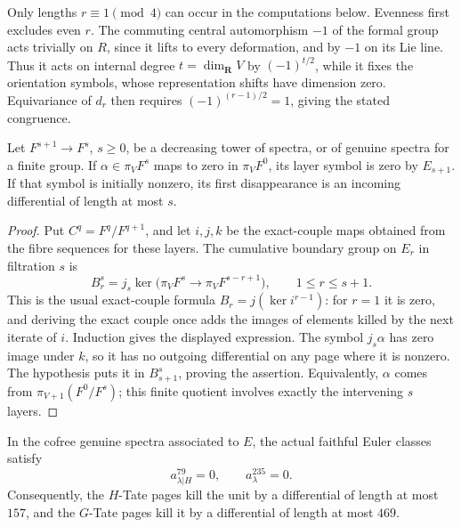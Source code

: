 Only lengths \(r\equiv1\pmod4\) can occur in the computations
below.  Evenness first excludes even \(r\).
The commuting central automorphism \(-1\) of the formal group
acts trivially on \(R\), since it lifts to every deformation,
and by \(-1\) on its Lie line.  Thus it acts on internal degree
\(t=\dim_{\mathbf R}V\) by \((-1)^{t/2}\), while it fixes the
orientation symbols, whose representation shifts have dimension zero.
Equivariance of \(d_r\) then requires
\((-1)^{(r-1)/2}=1\), giving the stated congruence.

\begin{lemma}
\label{det:finite-boundary}
Let \(F^{s+1}\to F^s\), \(s\geq0\), be a decreasing tower of
spectra, or of genuine spectra for a finite group.
If \(\alpha\in\pi_VF^s\) maps to zero in \(\pi_VF^0\),
its layer symbol is zero by \(E_{s+1}\).
If that symbol is initially nonzero, its first disappearance
is an incoming differential of length at most \(s\).
\end{lemma}

\begin{proof}
Put \(C^q=F^q/F^{q+1}\), and let \(i,j,k\) be the exact-couple
maps obtained from the fibre sequences for these layers.
The cumulative boundary group on \(E_r\) in filtration \(s\)
is
\[
 B_r^s
 =j_s\ker\bigl(\pi_VF^s\longrightarrow
                       \pi_VF^{s-r+1}\bigr),
 \qquad 1\leq r\leq s+1.
\]
This is the usual exact-couple formula \(B_r=j(\ker i^{r-1})\):
for \(r=1\) it is zero, and deriving the exact couple once
adds the images of elements killed by the next iterate of
\(i\).  Induction gives the displayed expression.
The symbol \(j_s\alpha\) has zero image under \(k\), so it
has no outgoing differential on any page where it is
nonzero.  The hypothesis puts it in \(B_{s+1}^s\), proving
the assertion.
Equivalently, \(\alpha\) comes from
\(\pi_{V+1}(F^0/F^s)\); this finite quotient involves exactly
the intervening \(s\) layers.
\end{proof}

\begin{proposition}\label{det:euler-bound}
In the cofree genuine spectra associated to \(E\), the actual
faithful Euler classes satisfy
\[
 a_{\lambda|H}^{79}=0,\qquad a_\lambda^{235}=0.
\]
Consequently, the \(H\)-Tate pages kill the unit by a
differential of length at most \(157\), and the \(G\)-Tate
pages kill it by a differential of length at most \(469\).
\end{proposition}

